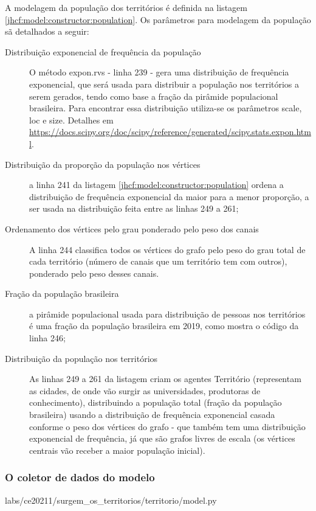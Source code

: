 A modelagem da população dos territórios é definida na listagem \ref{jhcf:model:constructor:population}. Os  parâmetros para modelagem da população sã detalhados a seguir:
\begin{description}
\item [Distribuição exponencial de frequência da população] O método expon.rvs - linha 239 - gera uma distribuição de frequência exponencial, que será usada para distribuir a população nos territórios a serem gerados, tendo como base a fração da pirâmide populacional brasileira. Para encontrar essa distribuição utiliza-se os parâmetros scale, loc e size. Detalhes em \url{https://docs.scipy.org/doc/scipy/reference/generated/scipy.stats.expon.html}. 
\item [Distribuição da proporção da população nos vértices] a linha 241 da listagem \ref{jhcf:model:constructor:population} ordena a distribuição de frequência exponencial da maior para a menor proporção, a ser usada na distribuição feita entre as linhas 249 a 261;
\item [Ordenamento dos vértices pelo grau ponderado pelo peso dos canais]
A linha 244 classifica todos os vértices do grafo pelo peso do grau total de cada território (número de canais que um território tem com outros), ponderado pelo peso desses canais.
\item [Fração da população brasileira] a pirâmide populacional usada para distribuição de pessoas nos territórios é uma fração da população brasileira em 2019, como mostra o código da linha 246;
\item [Distribuição da população nos territórios]
As linhas 249 a 261 da listagem criam os agentes Território (representam as cidades, de onde vão surgir as universidades, produtoras de conhecimento), distribuindo a população total (fração da população brasileira) usando a distribuição de frequência exponencial casada conforme o peso dos vértices do grafo - que também tem uma distribuição exponencial de frequência, já que são grafos livres de escala (os vértices centrais vão receber a maior população inicial).
\end{description}

\subsubsection{O coletor de dados do modelo}


{labs/ce20211/surgem_os_territorios/territorio/model.py}

